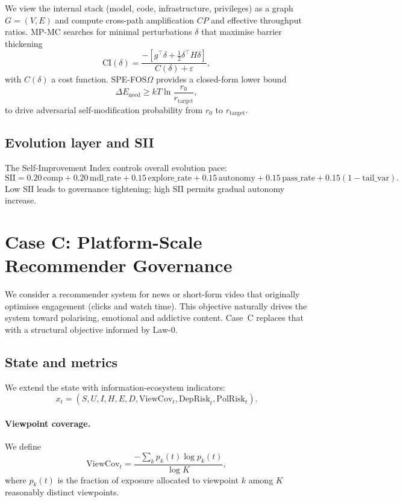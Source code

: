 \documentclass[11pt]{article}
\begin{document}
We view the internal stack (model, code, infrastructure, privileges) as a graph $G=(V,E)$ and compute cross-path amplification $CP$ and effective throughput ratios. MP-MC searches for minimal perturbations $\delta$ that maximise barrier thickening
\begin{equation}
\mathrm{CI}(\delta) =
\frac{-[g^\top\delta + \tfrac{1}{2}\delta^\top H\delta]}{C(\delta)+\varepsilon},
\end{equation}
with $C(\delta)$ a cost function. SPE-FOS$\Omega$ provides a closed-form lower bound
\[
\Delta E_{\mathrm{need}} \ge kT \ln\frac{r_0}{r_{\mathrm{target}}},
\]
to drive adversarial self-modification probability from $r_0$ to $r_{\mathrm{target}}$.

\subsection{Evolution layer and SII}

The Self-Improvement Index controls overall evolution pace:
\[
\mathrm{SII}
= 0.20\,\mathrm{comp}
+ 0.20\,\mathrm{mdl\_rate}
+ 0.15\,\mathrm{explore\_rate}
+ 0.15\,\mathrm{autonomy}
+ 0.15\,\mathrm{pass\_rate}
+ 0.15(1-\mathrm{tail\_var}).
\]
Low SII leads to governance tightening; high SII permits gradual autonomy increase.

\section{Case C: Platform-Scale Recommender Governance}
\label{sec:caseC}

We consider a recommender system for news or short-form video that originally optimises engagement (clicks and watch time). This objective naturally drives the system toward polarising, emotional and addictive content. Case~C replaces that with a structural objective informed by Law-0.

\subsection{State and metrics}

We extend the state with information-ecosystem indicators:
\[
x_t = (S,U,I,H,E,D,\mathrm{ViewCov}_t,\mathrm{DepRisk}_t,\mathrm{PolRisk}_t).
\]

\paragraph{Viewpoint coverage.}
We define
\[
\mathrm{ViewCov}_t = \frac{-\sum_k p_k(t)\log p_k(t)}{\log K},
\]
where $p_k(t)$ is the fraction of exposure allocated to viewpoint $k$ among $K$ reasonably distinct viewpoints.
\end{document}
